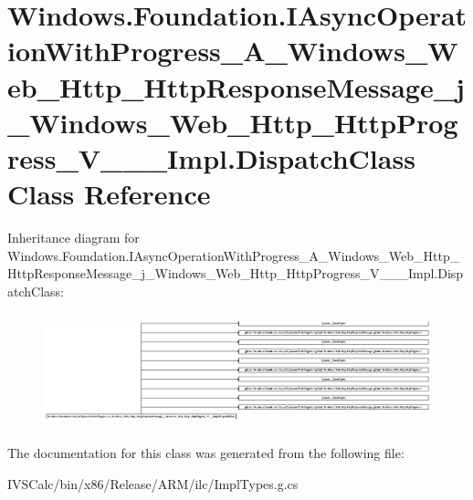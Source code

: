 \hypertarget{class_windows_1_1_foundation_1_1_i_async_operation_with_progress___a___windows___web___http___ht5010a30d35ff4eb8a90438b46c849655}{}\section{Windows.\+Foundation.\+I\+Async\+Operation\+With\+Progress\+\_\+\+A\+\_\+\+Windows\+\_\+\+Web\+\_\+\+Http\+\_\+\+Http\+Response\+Message\+\_\+j\+\_\+\+Windows\+\_\+\+Web\+\_\+\+Http\+\_\+\+Http\+Progress\+\_\+\+V\+\_\+\+\_\+\+\_\+\+Impl.\+Dispatch\+Class Class Reference}
\label{class_windows_1_1_foundation_1_1_i_async_operation_with_progress___a___windows___web___http___ht5010a30d35ff4eb8a90438b46c849655}
Inheritance diagram for Windows.\+Foundation.\+I\+Async\+Operation\+With\+Progress\+\_\+\+A\+\_\+\+Windows\+\_\+\+Web\+\_\+\+Http\+\_\+\+Http\+Response\+Message\+\_\+j\+\_\+\+Windows\+\_\+\+Web\+\_\+\+Http\+\_\+\+Http\+Progress\+\_\+\+V\+\_\+\+\_\+\+\_\+\+Impl.\+Dispatch\+Class\+:\begin{figure}[H]
\begin{center}
\leavevmode
\includegraphics[height=3.308271cm]{class_windows_1_1_foundation_1_1_i_async_operation_with_progress___a___windows___web___http___ht5010a30d35ff4eb8a90438b46c849655}
\end{center}
\end{figure}


The documentation for this class was generated from the following file\+:\begin{DoxyCompactItemize}
\item 
I\+V\+S\+Calc/bin/x86/\+Release/\+A\+R\+M/ilc/Impl\+Types.\+g.\+cs\end{DoxyCompactItemize}

